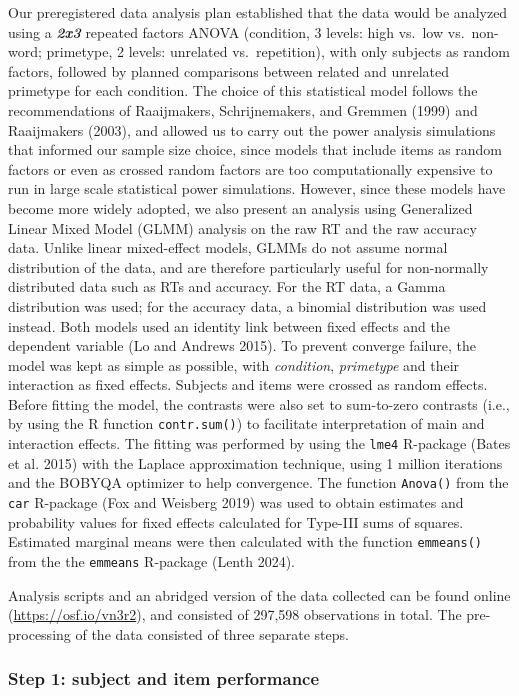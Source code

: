 \documentclass[
]{interact}
\begin{document}
Our preregistered data analysis plan established that the data would be
analyzed using a \textbf{\emph{2x3}} repeated factors ANOVA (condition,
3 levels: high vs.~low vs.~non-word; primetype, 2 levels: unrelated
vs.~repetition), with only subjects as random factors, followed by
planned comparisons between related and unrelated primetype for each
condition. The choice of this statistical model follows the
recommendations of Raaijmakers, Schrijnemakers, and Gremmen (1999) and
Raaijmakers (2003), and allowed us to carry out the power analysis
simulations that informed our sample size choice, since models that
include items as random factors or even as crossed random factors are
too computationally expensive to run in large scale statistical power
simulations. However, since these models have become more widely
adopted, we also present an analysis using Generalized Linear Mixed
Model (GLMM) analysis on the raw RT and the raw accuracy data. Unlike
linear mixed-effect models, GLMMs do not assume normal distribution of
the data, and are therefore particularly useful for non-normally
distributed data such as RTs and accuracy. For the RT data, a Gamma
distribution was used; for the accuracy data, a binomial distribution
was used instead. Both models used an identity link between fixed
effects and the dependent variable (Lo and Andrews 2015). To prevent
converge failure, the model was kept as simple as possible, with
\emph{condition}, \emph{primetype} and their interaction as fixed
effects. Subjects and items were crossed as random effects. Before
fitting the model, the contrasts were also set to sum-to-zero contrasts
(i.e., by using the R function \texttt{contr.sum()}) to facilitate
interpretation of main and interaction effects. The fitting was
performed by using the \texttt{lme4} R-package (Bates et al. 2015) with
the Laplace approximation technique, using 1 million iterations and the
BOBYQA optimizer to help convergence. The function \texttt{Anova()} from
the \texttt{car} R-package (Fox and Weisberg 2019) was used to obtain
estimates and probability values for fixed effects calculated for
Type-III sums of squares. Estimated marginal means were then calculated
with the function \texttt{emmeans()} from the the \texttt{emmeans}
R-package (Lenth 2024).

Analysis scripts and an abridged version of the data collected can be
found online (\url{https://osf.io/vn3r2}), and consisted of 297,598
observations in total. The pre-processing of the data consisted of three
separate steps.

\subsubsection{Step 1: subject and item
performance}\label{sec-exp1-analysis-performance}
\end{document}
